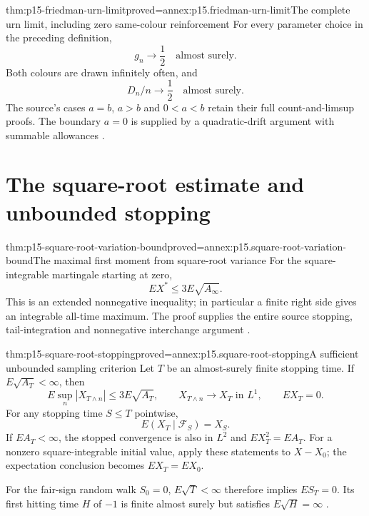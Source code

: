 \begin{hbtheorem}{thm:p15-friedman-urn-limit}{proved=annex:p15.friedman-urn-limit}{The complete urn limit, including zero same-colour reinforcement}
For every parameter choice in the preceding definition,
\[
                                   g_n\longrightarrow\frac12
                                          \quad\text{almost surely}.
\]
Both colours are drawn infinitely often, and
\[
                        D_n/n\longrightarrow\frac12
                                          \quad\text{almost surely}.
\]
The source's cases \(a=b\), \(a>b\) and \(0<a<b\) retain their
full count-and-limsup proofs. The boundary \(a=0\) is supplied by
a quadratic-drift argument with summable allowances
\cite[ex.~4.5.6]{DurrettPTEAuthor2019}.
\end{hbtheorem}

\section{The square-root estimate and unbounded stopping}
\label{sec:p15-square-root-variation}

\begin{hbtheorem}{thm:p15-square-root-variation-bound}{proved=annex:p15.square-root-variation-bound}{The maximal first moment from square-root variance}
For the square-integrable martingale starting at zero,
\[
                                  EX^*\leq3E\sqrt{A_\infty}.
\]
This is an extended nonnegative inequality; in particular a finite
right side gives an integrable all-time maximum.
The proof supplies the entire source stopping, tail-integration and
nonnegative interchange argument
\cite[thm.~4.5.7]{DurrettPTEAuthor2019}.
\end{hbtheorem}

\begin{hbtheorem}{thm:p15-square-root-stopping}{proved=annex:p15.square-root-stopping}{A sufficient unbounded sampling criterion}
Let \(T\) be an almost-surely finite stopping time.
If \(E\sqrt{A_T}<\infty\), then
\[
                       E\sup_n|X_{T\wedge n}|\leq3E\sqrt{A_T},
 \qquad X_{T\wedge n}\longrightarrow X_T\text{ in }L^1,\qquad EX_T=0.
\]
For any stopping time \(S\leq T\) pointwise,
\[
                              E(X_T\mid\mathcal F_S)=X_S.
\]
If \(EA_T<\infty\), the stopped convergence is also in \(L^2\)
and \(EX_T^2=EA_T\).
For a nonzero square-integrable initial value, apply these statements
to \(X-X_0\); the expectation conclusion becomes \(EX_T=EX_0\).

For the fair-sign random walk \(S_0=0\), \(E\sqrt T<\infty\)
therefore implies \(ES_T=0\). Its first hitting time \(H\) of
\(-1\) is finite almost surely but satisfies \(E\sqrt H=\infty\)
\cite[ex.~4.5.8]{DurrettPTEAuthor2019}.
\end{hbtheorem}


